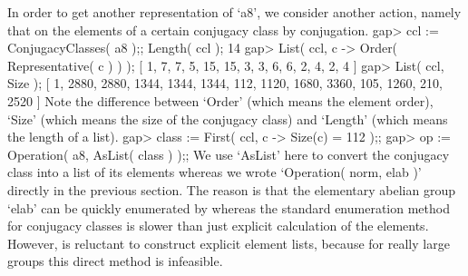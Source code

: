 In  order to get  another  representation  of  `a8', we consider  another
action, namely  that on  the elements   of a  certain conjugacy  class by
conjugation.
\beginexample
    gap> ccl := ConjugacyClasses( a8 );; Length( ccl );
    14
    gap> List( ccl, c -> Order( Representative( c ) ) );
    [ 1, 7, 7, 5, 15, 15, 3, 3, 6, 6, 2, 4, 2, 4 ]
    gap> List( ccl, Size );
    [ 1, 2880, 2880, 1344, 1344, 1344, 112, 1120, 1680, 3360, 105, 1260, 
      210, 2520 ]
\endexample
Note the  difference between  `Order'  (which means  the element  order),
`Size' (which means the size of the conjugacy  class) and `Length' (which
means the length of a  list).
\beginexample
    gap> class := First( ccl, c -> Size(c) = 112 );;
    gap> op := Operation( a8, AsList( class ) );;
\endexample
We use `AsList' here  to convert the conjugacy class  into a list  of its
elements whereas we   wrote  `Operation( norm,  elab )'   directly in the
previous section. The reason is that  the elementary abelian group `elab'
can  be quickly enumerated by   {\GAP}  whereas the standard  enumeration
method for conjugacy classes is  slower than just explicit calculation of
the elements. However, {\GAP} is reluctant  to construct explicit element
lists, because for really large groups this direct method is infeasible.

